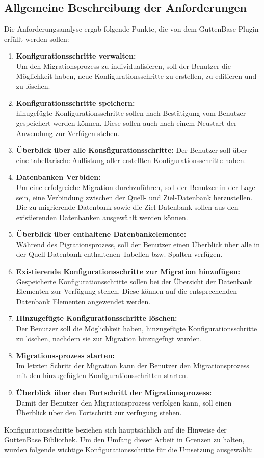 \subsection{Allgemeine Beschreibung der Anforderungen}
Die Anforderungsanalyse ergab folgende Punkte, die von dem GuttenBase Plugin erfüllt werden sollen:
\begin{enumerate}
	\item \textbf{Konfigurationsschritte verwalten:}\\
	Um den Migrationsprozess zu individualisieren, soll der Benutzer die Möglichkeit haben, neue Konfigurationsschritte zu erstellen, zu editieren und zu löschen.
	\item \textbf{Konfigurationsschritte speichern:} \\
	hinugefügte Konfigurationsschritte sollen nach Bestätigung vom Benutzer gespeichert werden können. Diese sollen auch nach einem Neustart der Anwendung zur Verfügen stehen.
	\item \textbf{Überblick über alle Konsfigurationsschritte:}
	Der Benutzer soll über eine tabellarische Auflistung aller erstellten Konfigurationsschritte haben.
	\item \textbf{Datenbanken Verbiden:} \\
	Um eine erfolgreiche Migration durchzuführen, soll der Benutzer in der Lage sein, eine Verbindung zwischen der Quell- und Ziel-Datenbank herzustellen. Die zu migrierende Datenbank sowie die Ziel-Datenbank sollen aus den existierenden Datenbanken ausgewählt werden können.
	\item \textbf{Überblick über enthaltene Datenbankelemente:}\\
	Während des Pigrationsprozess, soll der Benutzer einen Überblick über alle in der Quell-Datenbank enthaltenen Tabellen bzw. Spalten verfügen.
	\item \textbf{Existierende Konfigurationsschritte zur Migration hinzufügen:}\\
	Gespeicherte Konfigurationsschritte sollen bei der Übersicht der Datenbank Elementen zur Verfügung stehen. Diese können auf die entsprechenden Datenbank Elementen angewendet werden.
	\item \textbf{Hinzugefügte Konfigurationsschritte löschen:}\\	
	Der Benutzer soll die Möglichkeit haben, hinzugefügte Konfigurationsschritte zu löschen, nachdem sie zur Migration hinzugefügt wurden.
	\item \textbf{Migrationssprozess starten:} \\
	Im letzten Schritt der Migration kann der Benutzer den Migrationsprozess mit den hinzugefügten Konfigurationsschritten starten.	
	\item \textbf{Überblick über den Fortschritt der Migrationsprozess:}\\
	Damit der Benutzer den Migrationsprozess verfolgen kann, soll einen Überblick über den Fortschritt zur verfügung stehen. 
\end{enumerate}
Konfigurationsschritte beziehen sich hauptsächlich auf die Hinweise der GuttenBase Bibliothek. Um den Umfang dieser Arbeit in Grenzen zu halten, wurden folgende wichtige Konfigurationsschritte für die Umsetzung ausgewählt:

